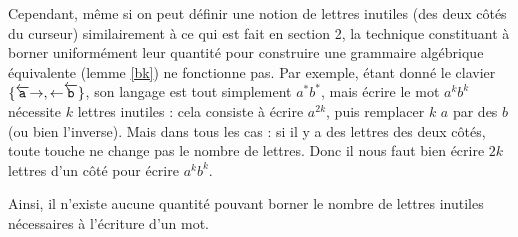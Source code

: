 \documentclass[12pt, a4paper]{article}
\begin{document}
    Cependant, même si on peut définir une notion de lettres inutiles (des deux côtés du curseur) similairement à ce qui est fait en section 2, la technique constituant à borner uniformément leur quantité pour construire une grammaire algébrique équivalente (lemme \ref{bk}) ne fonctionne pas.
    Par exemple, étant donné le clavier $\{\overleftarrow{\mathtt{a}}\mathord{\rightarrow},\mathord{\leftarrow}\overleftarrow{\mathtt{b}}\}$, son langage est tout simplement $a^*b^*$, mais écrire le mot $a^kb^k$ nécessite $k$ lettres inutiles : cela consiste à écrire $a^{2k}$, puis remplacer $k$ $a$ par des $b$ (ou bien l'inverse). Mais dans tous les cas : si il y a des lettres des deux côtés, toute touche ne change pas le nombre de lettres. Donc il nous faut bien écrire $2k$ lettres d'un côté pour écrire $a^kb^k$.
    
    Ainsi, il n'existe aucune quantité pouvant borner le nombre de lettres inutiles nécessaires à l'écriture d'un mot.
    
    \clearpage
    \appendix
\end{document}
